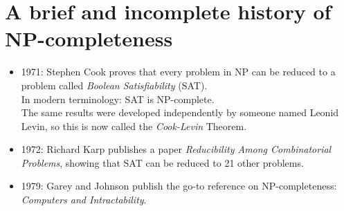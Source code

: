 \documentclass[11  pt]{article}
\begin{document}
	
	\section{A brief and incomplete history of NP-completeness}
	
	\begin{itemize}
		\item 1971: Stephen Cook proves that every problem in NP can be reduced to a problem called \emph{Boolean Satisfiability} (SAT).\\
		
		In modern terminology: SAT is NP-complete.\\
		
		The same results were developed independently by someone named Leonid Levin, so this is now called the \emph{Cook-Levin} Theorem. \\
		\item 1972: Richard Karp publishes a paper \emph{Reducibility Among Combinatorial Problems}, showing that SAT can be reduced to 21 other problems. \\
		
		
		\item 1979: Garey and Johnson publish the go-to reference on NP-completeness: \emph{Computers and Intractability}.
	\end{itemize}
	
	
	
	
\end{document}
